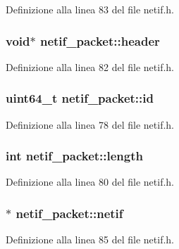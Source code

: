 Definizione alla linea 83 del file netif.\+h.

\hypertarget{structnetif__packet_a3733c55855518d575eea678f5a2815e8}{
\subsubsection[{header}]{\setlength{\rightskip}{0pt plus 5cm}void$\ast$ netif\+\_\+packet\+::header}}\label{structnetif__packet_a3733c55855518d575eea678f5a2815e8}


Definizione alla linea 82 del file netif.\+h.

\hypertarget{structnetif__packet_ac2dc39fe302e155960127c09161f36ae}{
\subsubsection[{id}]{\setlength{\rightskip}{0pt plus 5cm}uint64\+\_\+t netif\+\_\+packet\+::id}}\label{structnetif__packet_ac2dc39fe302e155960127c09161f36ae}


Definizione alla linea 78 del file netif.\+h.

\hypertarget{structnetif__packet_a244620016b7d377fd2558f5ccfc85d18}{
\subsubsection[{length}]{\setlength{\rightskip}{0pt plus 5cm}int netif\+\_\+packet\+::length}}\label{structnetif__packet_a244620016b7d377fd2558f5ccfc85d18}


Definizione alla linea 80 del file netif.\+h.

\hypertarget{structnetif__packet_a3590a941c954bab54971940eeab55144}{
\subsubsection[{netif}]{$\ast$ netif\+\_\+packet\+::netif}}\label{structnetif__packet_a3590a941c954bab54971940eeab55144}


Definizione alla linea 85 del file netif.\+h.

